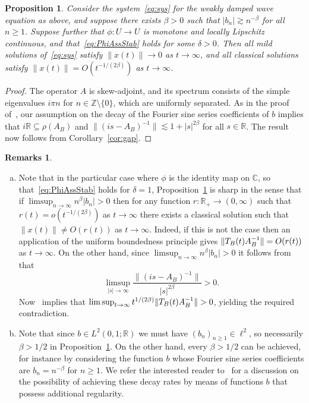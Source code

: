 \documentclass[11pt, a4paper]{amsart}
\newcommand{\RR}{\mathbb{R}}
\newcommand{\CC}{\mathbb{C}}
\newcommand{\ZZ}{\mathbb{Z}}
\newcommand{\inv}{^{-1}}
\newtheorem{prp}[thm]{Proposition}
\theoremstyle{definition}
\newtheorem{rems}[thm]{Remarks}
\numberwithin{equation}{section}
\begin{document}
\begin{prp}\label{prp:weak}
Consider the system~\eqref{eq:sys} for the weakly damped wave equation as above, and suppose there exists $\beta>0$ such that $|b_n|\gtrsim n^{-\beta}$ for all $n\ge1$. Suppose further that $\phi\colon U\to U$ is monotone and locally Lipschitz continuous, and that~\eqref{eq:PhiAssStab} holds for some $\delta>0$. Then all  mild solutions of~\eqref{eq:sys} satisfy $\|x(t)\|\to 0$ as $t\to\infty$, and all classical solutions satisfy $\|x(t)\|= O(t^{-1/(2\beta)})$ as $t\to\infty$.
\end{prp}

\begin{proof}
The operator $A$ is skew-adjoint, and its spectrum consists of the simple eigenvalues $i\pi n$ for $n\in\ZZ\setminus\{0\}$, which are uniformly separated. As in the proof of~\cite[Cor.~6.3]{ChiPau23}, our assumption on the decay of the Fourier sine series coefficients of $b$ implies that $i\RR\subseteq\rho(A_B)$ and $\|(is-A_B)\inv\|\lesssim 1+|s|^{2\beta}$ for all $s\in\RR$. The result now follows from Corollary~\ref{cor:gap}.
\end{proof}

\begin{rems}
\begin{enumerate}[(a)]
\item Note that in the particular case where $\phi$ is the identity map on $\CC$, so that~\eqref{eq:PhiAssStab} holds for $\delta=1$,  Proposition~\ref{prp:weak} is sharp in the sense that if $\limsup_{n\to\infty}n^\beta|b_n|>0$ then for any function $r\colon\RR_+\to(0,\infty)$ such that $r(t)=o(t^{-1/(2\beta)})$ as $t\to\infty$ there exists a classical solution such that $\|x(t)\|\ne O(r(t))$ as $t\to\infty$. Indeed, if this is not the case then an application of the uniform boundedness principle gives $\|T_B(t)\smash{A_B^{-1}}\|=O(r(t))$ as $t\to\infty$. On the other hand, since $\limsup_{n\to\infty}n^\beta|b_n|>0$ it follows from~\cite[Prop.~5.1]{ChiPau23} that 
$$\limsup_{|s|\to\infty}\frac{\|(is-A_B)^{-1}\|}{|s|^{2\beta}}>0.$$
 Now~\cite[Prop.~5.3]{ChiPau23} implies that $\limsup_{t\to\infty}t^{1/(2\beta)}\|T_B(t)\smash{A_B\inv}\|>0$, yielding the required contradiction.
\item Note that since $b\in L^2(0,1;\RR)$ we must have $(b_n)_{n\ge1}\in\ell^2$, so necessarily $\beta>1/2$ in Proposition~\ref{prp:weak}. On the other hand, every $\beta>1/2$ can be achieved, for instance by considering the function $b$ whose Fourier sine series coefficients are $b_n=n^{-\beta}$ for $n\ge1$. We refer the interested reader to~\cite[Rem.~6.4]{ChiPau23} for a discussion on the possibility of achieving these decay rates by means of functions $b$ that possess additional regularity.
\end{enumerate}
\end{rems}
\end{document}
